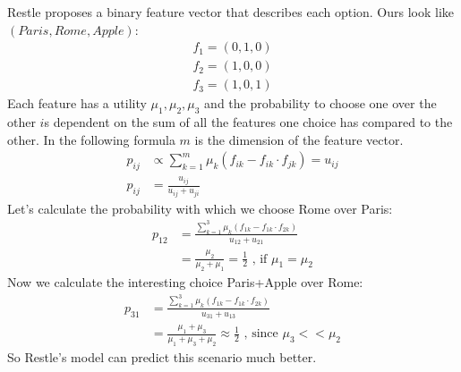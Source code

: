\documentclass[../main/Notes.tex]{subfiles}
\begin{document}
Restle proposes a binary feature vector that describes each option. Ours look like $(Paris, Rome, Apple)$:
\begin{align*}
f_1 = (0, 1, 0)\\
f_2 = (1, 0, 0)\\
f_3 = (1, 0, 1)
\end{align*}
Each feature has a utility $\mu_1,\mu_2,\mu_3$ and the probability to choose one over the other $i$s dependent on the sum of all the features one choice has compared to the other. In the following formula $m$ is the dimension of the feature vector.
\begin{align*}
p_{ij} &\propto \sum_{k=1}^{m}\mu_k(f_{ik}-f_{ik}\cdot f_{jk}) = u_{ij}\\
p_{ij} &= \frac{u_{ij}}{u_{ij}+u_{ji}}
\end{align*}
Let's calculate the probability with which we choose Rome over Paris:
\begin{align*}
p_{12} &= \frac{\sum_{k=1}^3\mu_k(f_{1k}-f_{1k} \cdot f_{2k})}{u_{12}+u_{21}}\\
       &= \frac{\mu_2}{\mu_2+\mu_1} = \frac{1}{2} \text{ , if $\mu_1=\mu_2$}
\end{align*}
Now we calculate the interesting choice Paris+Apple over Rome:
\begin{align*}
p_{31} &= \frac{\sum_{k=1}^3\mu_k(f_{1k}-f_{1k} \cdot f_{2k})}{u_{31}+u_{13}}\\
       &= \frac{\mu_1+\mu_3}{\mu_1+\mu_3+\mu_2} \approx \frac{1}{2} \text{ , since $\mu_3 << \mu_2$}
\end{align*}
So Restle's model can predict this scenario much better.
\end{document}
